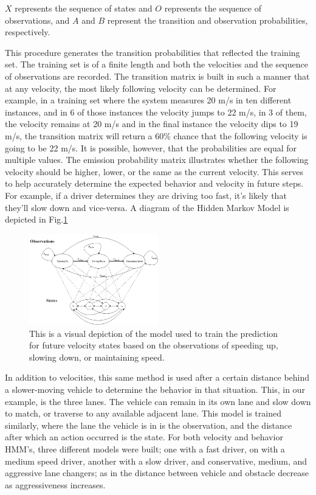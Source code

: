\documentclass[conference]{IEEEtran}
\begin{document}
$X$ represents the sequence of states and $O$ represents the sequence of observations, and $A$ and $B$ represent the transition and observation probabilities, respectively. 

This procedure generates the transition probabilities that reflected the training set. The training set is of a finite length and both the velocities and the sequence of observations are recorded. The transition matrix is built in such a manner that at any velocity, the most likely following velocity can be determined. For example, in a training set where the system measures 20 m/s in ten different instances, and in 6 of those instances the velocity jumps to 22 m/s, in 3 of them, the velocity remains at 20 m/s and in the final instance the velocity dips to 19 m/s, the transition matrix will return a 60\% chance that the following velocity is going to be 22 m/s. It is possible, however, that the probabilities are equal for multiple values. The emission probability matrix illustrates whether the following velocity should be higher, lower, or the same as the current velocity. This serves to help accurately determine the expected behavior and velocity in future steps. For example, if a driver determines they are driving too fast, it's likely that they'll slow down and vice-versa. A diagram of the Hidden Markov Model is depicted in Fig.\ref{fig:hmmdiag}

\begin{figure}[ht]
    \includegraphics[width=0.5\textwidth]{hmmdiag.jpg}
    \caption{This is a visual depiction of the model used to train the prediction for future velocity states based on the observations of speeding up, slowing down, or maintaining speed.}
    \label{fig:hmmdiag}
\end{figure}

In addition to velocities, this same method is used after a certain distance behind a slower-moving vehicle to determine the behavior in that situation. This, in our example, is the three lanes. The vehicle can remain in its own lane and slow down to match, or traverse to any available adjacent lane. This model is trained similarly, where the lane the vehicle is in is the observation, and the distance after which an action occurred is the state. For both velocity and behavior HMM's, three different models were built; one with a fast driver, on with a medium speed driver, another with a slow driver, and conservative, medium, and aggressive lane changers; as in the distance between vehicle and obstacle decrease as aggressiveness increases.
\end{document}
